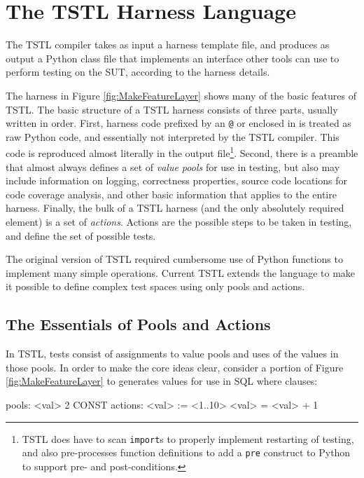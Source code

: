 \section{The TSTL Harness Language}

The TSTL compiler takes as input a harness template file, and produces
as output a Python class file that implements an interface other tools
can use to perform testing on the SUT, according to the harness details.

The harness in Figure \ref{fig:MakeFeatureLayer} shows many of the
basic features of TSTL.  The basic structure of a TSTL harness
consists of three parts, usually written in order.  First, harness
code prefixed by an {\tt @} or enclosed in {\tt <@ @>} is treated as
raw Python code, and essentially not interpreted by the TSTL
compiler.  This code is reproduced almost literally in the output
file\footnote{TSTL does have to scan {\tt import}s to properly
  implement restarting of testing, and also pre-processes function
  definitions to add a {\tt pre} construct to Python to support
pre- and post-conditions.}.  Second, there is a preamble that almost
always defines a set of \emph{value pools} for use in testing, but
also may include information on logging, correctness properties,
source code locations for code coverage analysis, and other basic
information that applies to the entire harness.  Finally, the bulk of
a TSTL harness (and the only absolutely required element) is a set of
\emph{actions}.  Actions are the possible steps to be taken in
testing, and define the set of possible tests.

The original version of TSTL \cite{NFM15} required cumbersome use of Python
functions to implement many simple operations.  Current TSTL extends
the language to make it possible to define complex test spaces
using only pools and actions.

\subsection{The Essentials of Pools and Actions}

In TSTL, tests consist of assignments to value pools and uses of the
values in those pools.  In order to make the core ideas clear,
consider a portion of Figure \ref{fig:MakeFeatureLayer} to
generates values for use in SQL where clauses:

{\scriptsize
\begin{code}
pools:
  <val> 2 CONST
\vspace{0.05in}
actions:
\vspace{0.05in}
<val> := <1..10>
<val> = <val> + 1
\end{code}
}

